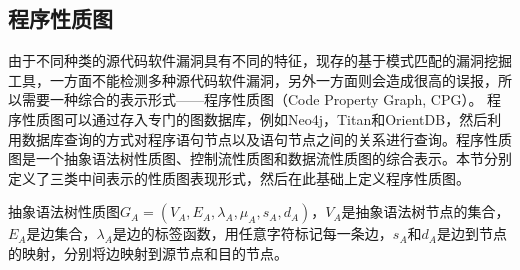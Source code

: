 
\subsection{程序性质图}\label{程序性质图}

由于不同种类的源代码软件漏洞具有不同的特征，现存的基于模式匹配的漏洞挖掘工具，一方面不能检测多种源代码软件漏洞，另外一方面则会造成很高的误报，所以需要一种综合的表示形式{——}程序性质图（Code Property Graph, CPG）。
程序性质图可以通过存入专门的图数据库，例如Neo4j，Titan和OrientDB，然后利用数据库查询的方式对程序语句节点以及语句节点之间的关系进行查询。程序性质图是一个抽象语法树性质图、控制流性质图和数据流性质图的综合表示。本节分别定义了三类中间表示的性质图表现形式，然后在此基础上定义程序性质图。

\begin{definition}
\label{抽象语法树定义}
抽象语法树性质图$G _{A}=(V_{A},E_{A},\lambda _{A}, \mu _{A}, s _{A}, d _{A})$，$V_{A}$是抽象语法树节点的集合，$E_{A}$是边集合，$\lambda _{A}$是边的标签函数，用任意字符标记每一条边，$s _{A}$和$d _{A}$是边到节点的映射，分别将边映射到源节点和目的节点。
\end{definition}


